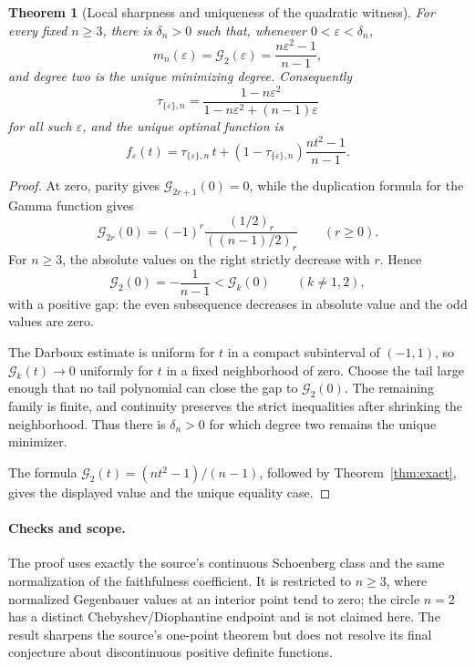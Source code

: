 \documentclass[11pt]{article}
\newtheorem{theorem}{Theorem}
\newcommand{\G}{\mathcal G}
\begin{document}
\begin{theorem}[Local sharpness and uniqueness of the quadratic witness]
For every fixed \(n\geq3\), there is \(\delta_n>0\) such that, whenever
\(0<\varepsilon<\delta_n\),
\[
 m_n(\varepsilon)=\G_2(\varepsilon)
 =\frac{n\varepsilon^2-1}{n-1},
\]
and degree two is the unique minimizing degree.  Consequently
\[
 \boxed{\displaystyle
 \tau_{\{\varepsilon\},n}
 =\frac{1-n\varepsilon^2}
 {1-n\varepsilon^2+(n-1)\varepsilon}}
\]
for all such \(\varepsilon\), and the unique optimal function is
\[
 f_\varepsilon(t)
 =\tau_{\{\varepsilon\},n}\,t
 +(1-\tau_{\{\varepsilon\},n})
   \frac{nt^2-1}{n-1}.
\]
\end{theorem}

\begin{proof}
At zero, parity gives \(\G_{2r+1}(0)=0\), while the duplication formula for
the Gamma function gives
\[
 \G_{2r}(0)
 =(-1)^r\frac{(1/2)_r}{((n-1)/2)_r}
 \qquad(r\geq0).
\]
For \(n\geq3\), the absolute values on the right strictly decrease with
\(r\).  Hence
\[
 \G_2(0)=-\frac1{n-1}
 <\G_k(0)\qquad(k\ne1,2),
\]
with a positive gap: the even subsequence decreases in absolute value and
the odd values are zero.

The Darboux estimate is uniform for \(t\) in a compact subinterval of
\((-1,1)\), so \(\G_k(t)\to0\) uniformly for \(t\) in a fixed neighborhood
of zero.  Choose the tail large enough that no tail polynomial can close the
gap to \(\G_2(0)\).  The remaining family is finite, and continuity preserves
the strict inequalities after shrinking the neighborhood.  Thus there is
\(\delta_n>0\) for which degree two remains the unique minimizer.

The formula
\(\G_2(t)=(nt^2-1)/(n-1)\), followed by Theorem~\ref{thm:exact}, gives the
displayed value and the unique equality case.
\end{proof}

\paragraph{Checks and scope.}
The proof uses exactly the source's continuous Schoenberg class and the same
normalization of the faithfulness coefficient.  It is restricted to
\(n\geq3\), where normalized Gegenbauer values at an interior point tend to
zero; the circle \(n=2\) has a distinct Chebyshev/Diophantine endpoint and is
not claimed here.  The result sharpens the source's one-point theorem but
does not resolve its final conjecture about discontinuous positive definite
functions.
\end{document}
